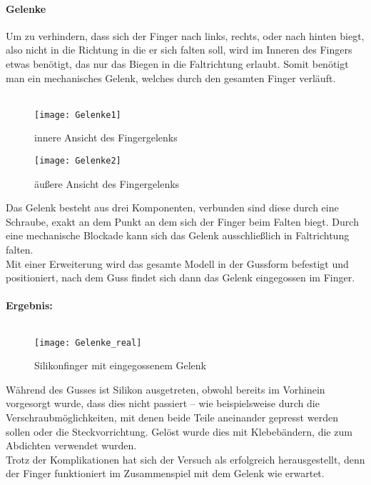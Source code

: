 \documentclass[titlepage,12pt,twoside]{article}
\begin{document}
\paragraph{Gelenke}
\hfill \break
\hfill \break
Um zu verhindern, dass sich der Finger nach links, rechts, oder nach hinten biegt, also nicht in die Richtung in die er sich falten soll, wird im Inneren des Fingers etwas benötigt, das nur das Biegen in die Faltrichtung erlaubt. Somit benötigt man ein 
mechanisches Gelenk, welches durch den gesamten Finger verläuft. \\
\\
\begin{figure}[H]
	\begin{center}
		\scalebox{0.8}
		{\texttt{[image: Gelenke1]}}
		\caption{innere Ansicht des Fingergelenks}
		\label{fig:Gelenke1}			
	\end{center}
\end{figure}
\begin{figure}[H]
	\begin{center}
		\scalebox{0.8}
		{\texttt{[image: Gelenke2]}}
		\caption{äußere Ansicht des Fingergelenks}
		\label{fig:Gelenke2}			
	\end{center}
\end{figure}
\hfill \break
Das Gelenk besteht aus drei Komponenten, verbunden sind diese durch eine Schraube, exakt an dem Punkt an dem sich der Finger beim Falten biegt. Durch eine mechanische Blockade kann sich das Gelenk ausschließlich in Faltrichtung falten. \\
Mit einer Erweiterung wird das gesamte Modell in der Gussform befestigt und positioniert, nach dem Guss findet sich dann das Gelenk eingegossen im Finger. \\
\\
\newpage
\textbf{Ergebnis:} \\
\\
\begin{figure}[H]
	\begin{center}
		\scalebox{0.8}
		{\texttt{[image: Gelenke\_real]}}
		\caption{Silikonfinger mit eingegossenem Gelenk}
		\label{fig:Gelenke_real}			
	\end{center}
\end{figure}
\hfill \break
Während des Gusses ist Silikon ausgetreten, obwohl bereits im Vorhinein vorgesorgt wurde, dass dies nicht passiert – wie beispielsweise durch die Verschraubmöglichkeiten, mit denen beide Teile aneinander gepresst werden sollen oder die Steckvorrichtung. 
Gelöst wurde dies mit Klebebändern, die zum Abdichten verwendet wurden. \\
Trotz der Komplikationen hat sich der Versuch als erfolgreich herausgestellt, denn der Finger funktioniert im Zusammenspiel mit dem Gelenk wie erwartet. \\
\newpage
\end{document}
